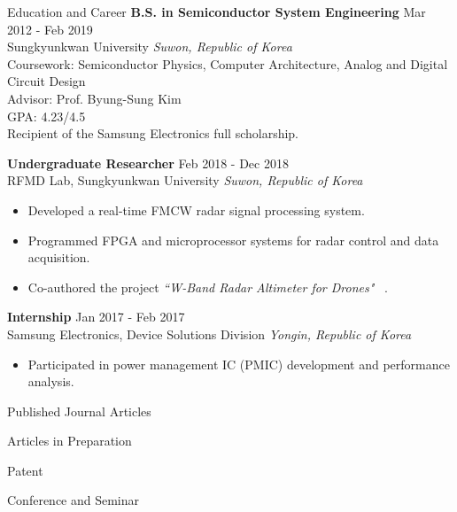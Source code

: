 \documentclass{resume} %
\newcommand*{\AddCiteToCategory}[1]{%
  \AtNextCite{\AtEachCitekey{#1}}}
\newcommand{\citeJour}{\AddCiteToCategory{J}\cite}
\begin{document}
\begin{rSection}{Education and Career}
{\bf B.S. in Semiconductor System Engineering} \hfill {Mar 2012 - Feb 2019}\\
Sungkyunkwan University \hfill \textit{Suwon, Republic of Korea}\\
Coursework: Semiconductor Physics, Computer Architecture, Analog and Digital Circuit Design\\
Advisor: Prof. Byung-Sung Kim\\
GPA: 4.23/4.5 \\
Recipient of the Samsung Electronics full scholarship.

{\bf Undergraduate Researcher} \hfill Feb 2018 - Dec 2018\\
RFMD Lab, Sungkyunkwan University \hfill \textit{Suwon, Republic of Korea}
 \begin{itemize}
    \itemsep -3pt {} 
     \item Developed a real-time FMCW radar signal processing system.
     \item Programmed FPGA and microprocessor systems for radar control and data acquisition.
     \item Co-authored the project \textit{``W-Band Radar Altimeter for Drones"}~\citeJour{RADAR}.
 \end{itemize}

{\bf Internship} \hfill Jan 2017 - Feb 2017\\
Samsung Electronics, Device Solutions Division \hfill \textit{Yongin, Republic of Korea}
 \begin{itemize}
    \itemsep -3pt {} 
     \item Participated in power management IC (PMIC) development and performance analysis.
 \end{itemize}

\end{rSection}


\nocite{*}
\begin{rSection}{Published Journal Articles}
\printbibliography[title={~}, type=article, resetnumbers=true]    
\end{rSection}
\begin{rSection}{Articles in Preparation}
\printbibliography[title={~}, type=unpublished, resetnumbers=true]    
\end{rSection}
\begin{rSection}{Patent}
\printbibliography[title={~}, type=patent, resetnumbers=true]
\end{rSection}
\begin{rSection}{Conference and Seminar}
\printbibliography[title={~}, type=misc, resetnumbers=true]    
\end{rSection}
\end{document}

